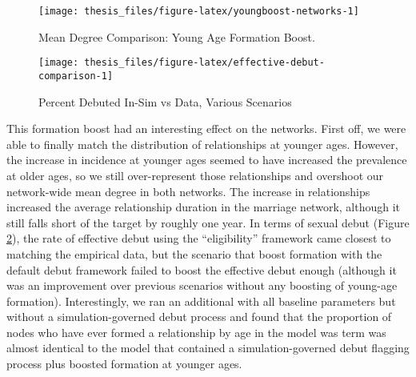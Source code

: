 \documentclass [11pt, proquest] {uwthesis}[2015/03/03]
\begin{document}
\begin{figure}

{\centering \texttt{[image: thesis\_files/figure-latex/youngboost-networks-1]} 

}

\caption{Mean Degree Comparison: Young Age Formation Boost.}\label{fig:youngboost-networks}
\end{figure}
\begin{figure}

{\centering \texttt{[image: thesis\_files/figure-latex/effective-debut-comparison-1]} 

}

\caption{Percent Debuted In-Sim vs Data, Various Scenarios}\label{fig:effective-debut-comparison}
\end{figure}
This formation boost had an interesting effect on the networks. First off, we were able to finally match the distribution of relationships at younger ages. However, the increase in incidence at younger ages seemed to have increased the prevalence at older ages, so we still over-represent those relationships and overshoot our network-wide mean degree in both networks. The increase in relationships increased the average relationship duration in the marriage network, although it still falls short of the target by roughly one year. In terms of sexual debut (Figure \ref{fig:effective-debut-comparison}), the rate of effective debut using the ``eligibility'' framework came closest to matching the empirical data, but the scenario that boost formation with the default debut framework failed to boost the effective debut enough (although it was an improvement over previous scenarios without any boosting of young-age formation). Interestingly, we ran an additional with all baseline parameters but without a simulation-governed debut process and found that the proportion of nodes who have ever formed a relationship by age in the model was term was almost identical to the model that contained a simulation-governed debut flagging process plus boosted formation at younger ages.
\end{document}
